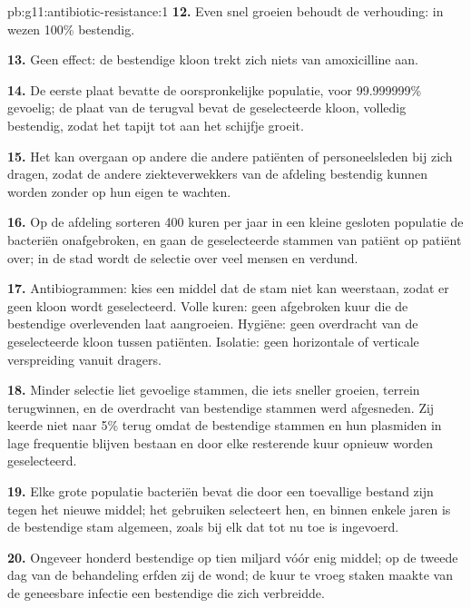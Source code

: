 \begin{solution}{pb:g11:antibiotic-resistance:1}
\textbf{12.} Even snel groeien behoudt de verhouding: in wezen 100\%
bestendig.

\textbf{13.} Geen effect: de bestendige kloon trekt zich niets van
amoxicilline aan.

\textbf{14.} De eerste plaat bevatte de oorspronkelijke populatie, voor
99.999999\% gevoelig; de plaat van de terugval bevat de geselecteerde
kloon, volledig bestendig, zodat het tapijt tot aan het schijfje groeit.

\textbf{15.} Het  kan overgaan op andere  die andere patiënten
of personeelsleden bij zich dragen, zodat de andere ziekteverwekkers van
de afdeling bestendig kunnen worden zonder op hun eigen  te
wachten.

\textbf{16.} Op de afdeling sorteren 400 kuren per jaar in een kleine
gesloten populatie de bacteriën onafgebroken, en gaan de geselecteerde
stammen van patiënt op patiënt over; in de stad wordt de selectie over
veel mensen en  verdund.

\textbf{17.} Antibiogrammen: kies een middel dat de stam niet kan
weerstaan, zodat er geen kloon wordt geselecteerd. Volle kuren: geen
afgebroken kuur die de bestendige overlevenden laat aangroeien. Hygiëne:
geen overdracht van de geselecteerde kloon tussen patiënten. Isolatie:
geen horizontale of verticale verspreiding vanuit dragers.

\textbf{18.} Minder selectie liet gevoelige stammen, die iets sneller
groeien, terrein terugwinnen, en de overdracht van bestendige stammen werd
afgesneden. Zij keerde niet naar 5\% terug omdat de bestendige stammen en
hun plasmiden in lage frequentie blijven bestaan en door elke resterende
kuur opnieuw worden geselecteerd.

\textbf{19.} Elke grote populatie bacteriën bevat  die door een
toevallige  bestand zijn tegen het nieuwe middel; het gebruiken
selecteert hen, en binnen enkele jaren is de bestendige stam algemeen,
zoals bij elk  dat tot nu toe is ingevoerd.

\textbf{20.} Ongeveer honderd bestendige  op tien miljard vóór enig
middel; op de tweede dag van de behandeling erfden zij de wond; de kuur te
vroeg staken maakte van de geneesbare infectie een bestendige die zich
verbreidde.
\end{solution}
